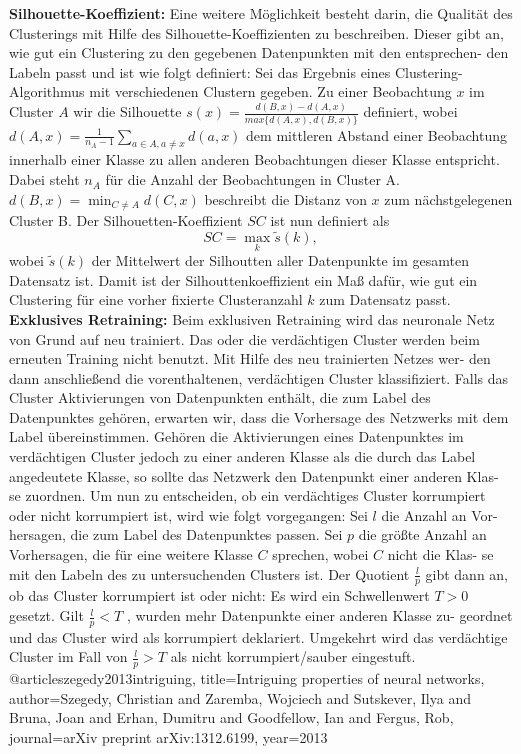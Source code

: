 \documentclass[11pt,a4paper]{article}
\numberwithin{equation}{section}
\begin{document}
		\noindent \textbf{Silhouette-Koeffizient:} Eine weitere Möglichkeit besteht darin, die Qualität
		des Clusterings mit Hilfe des Silhouette-Koeffizienten zu beschreiben. Dieser gibt
		an, wie gut ein Clustering zu den gegebenen Datenpunkten mit den entsprechen-
		den Labeln passt und ist wie folgt definiert: Sei das Ergebnis eines Clustering-
		Algorithmus mit verschiedenen Clustern gegeben. Zu einer Beobachtung $x$ im Cluster $A$ wir die Silhouette $s(x) = \frac{d(B,x)-d(A,x)}{max\lbrace d(A,x), d(B,x) \rbrace}$ definiert, wobei $d(A,x)  = \frac{1}{n_A -1}\sum_{a \in A, a \neq x}{d(a,x)}$ dem mittleren Abstand einer Beobachtung innerhalb einer Klasse zu allen anderen Beobachtungen dieser Klasse entspricht.
		Dabei steht $n_A$ für die Anzahl der Beobachtungen in Cluster A. $d(B,x) = \min_{C \neq A}d(C,x)$ beschreibt die Distanz von $x$ zum nächstgelegenen Cluster B. Der Silhouetten-Koeffizient $SC$ ist nun definiert als
		\begin{equation}
			SC = \max_k \tilde{s}(k),
		\end{equation}
		wobei $\tilde{s}(k)$ der Mittelwert der Silhoutten aller Datenpunkte im gesamten Datensatz ist. Damit ist der Silhouttenkoeffizient ein Maß dafür, wie gut ein Clustering für eine vorher fixierte Clusteranzahl $k$ zum Datensatz passt.\\
		
		\noindent \textbf{Exklusives Retraining:} Beim exklusiven Retraining wird das neuronale Netz
		von Grund auf neu trainiert. Das oder die verdächtigen Cluster werden beim
		erneuten Training nicht benutzt. Mit Hilfe des neu trainierten Netzes wer-
		den dann anschließend die vorenthaltenen, verdächtigen Cluster klassifiziert.
		Falls das Cluster Aktivierungen von Datenpunkten enthält, die zum Label des
		Datenpunktes gehören, erwarten wir, dass die Vorhersage des Netzwerks mit
		dem Label übereinstimmen. Gehören die Aktivierungen eines Datenpunktes im
		verdächtigen Cluster jedoch zu einer anderen Klasse als die durch das Label
		angedeutete Klasse, so sollte das Netzwerk den Datenpunkt einer anderen Klas-
		se zuordnen. Um nun zu entscheiden, ob ein verdächtiges Cluster korrumpiert
		oder nicht korrumpiert ist, wird wie folgt vorgegangen: Sei $l$ die Anzahl an Vor-
		hersagen, die zum Label des Datenpunktes passen. Sei $p$ die größte Anzahl an
		Vorhersagen, die für eine weitere Klasse $C$ sprechen, wobei $C$ nicht die Klas-
		se mit den Labeln des zu untersuchenden Clusters ist. Der Quotient $\frac{l}{p}$ gibt
		dann an, ob das Cluster korrumpiert ist oder nicht: Es wird ein Schwellenwert
		$T > 0$ gesetzt. Gilt $\frac{l}{p} < T$ , wurden mehr Datenpunkte einer anderen Klasse zu-
		geordnet und das Cluster wird als korrumpiert deklariert. Umgekehrt wird das
		verdächtige Cluster im Fall von $\frac{l}{p} > T$ als nicht korrumpiert/sauber eingestuft.
		@article{szegedy2013intriguing,
			title={Intriguing properties of neural networks},
			author={Szegedy, Christian and Zaremba, Wojciech and Sutskever, Ilya and Bruna, Joan and Erhan, Dumitru and Goodfellow, Ian and Fergus, Rob},
			journal={arXiv preprint arXiv:1312.6199},
			year={2013}
		}
		
\end{document}

